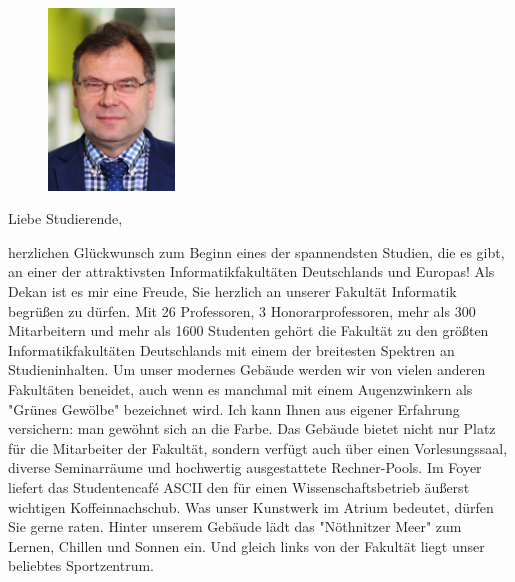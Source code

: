 \thispagestyle{empty}
\ 
\pagebreak


\begin{figure}
  \vspace{-15pt}
  \begin{centering}
    \includegraphics[width=0.3\textwidth]{img/uweassmann.png}
  \end{centering}
  \vspace{-20pt}
\end{figure}

Liebe Studierende,

herzlichen Glückwunsch zum Beginn eines der spannendsten Studien, die es gibt, an einer der attraktivsten Informatikfakultäten Deutschlands und Europas! Als Dekan ist es mir eine Freude, Sie herzlich an unserer Fakultät Informatik begrüßen zu dürfen. Mit 26 Professoren, 3 Honorarprofessoren, mehr als 300 Mitarbeitern und mehr als 1600 Studenten gehört die Fakultät zu den größten Informatikfakultäten Deutschlands mit einem der breitesten Spektren an Studieninhalten. Um unser modernes Gebäude werden wir von vielen anderen Fakultäten beneidet, auch wenn es manchmal mit einem Augenzwinkern als "Grünes Gewölbe" bezeichnet wird. Ich kann Ihnen aus eigener Erfahrung versichern: man gewöhnt sich an die Farbe. Das Gebäude bietet nicht nur Platz für die Mitarbeiter der Fakultät, sondern verfügt auch über einen Vorlesungssaal, diverse Seminarräume und hochwertig ausgestattete Rechner-Pools. Im Foyer liefert das Studentencafé ASCII den für einen Wissenschaftsbetrieb äußerst wichtigen Koffeinnachschub. Was unser Kunstwerk im Atrium bedeutet, dürfen Sie gerne raten. Hinter unserem Gebäude lädt das "Nöthnitzer Meer" zum Lernen, Chillen und Sonnen ein. Und gleich links von der Fakultät liegt unser beliebtes Sportzentrum.

